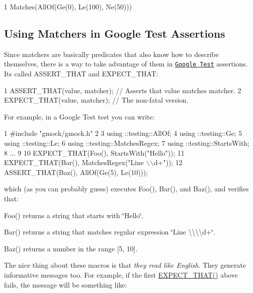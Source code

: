 \begin{DoxyCode}
1 Matches(AllOf(Ge(0), Le(100), Ne(50)))
\end{DoxyCode}


\subsection*{Using Matchers in Google Test Assertions}

Since matchers are basically predicates that also know how to describe themselves, there is a way to take advantage of them in \href{../../googletest/}{\tt Google Test} assertions. It\textquotesingle{}s called {\ttfamily A\+S\+S\+E\+R\+T\+\_\+\+T\+H\+AT} and {\ttfamily E\+X\+P\+E\+C\+T\+\_\+\+T\+H\+AT}\+:


\begin{DoxyCode}
1 ASSERT\_THAT(value, matcher);  // Asserts that value matches matcher.
2 EXPECT\_THAT(value, matcher);  // The non-fatal version.
\end{DoxyCode}


For example, in a Google Test test you can write\+:


\begin{DoxyCode}
1 #include "gmock/gmock.h"
2 
3 using ::testing::AllOf;
4 using ::testing::Ge;
5 using ::testing::Le;
6 using ::testing::MatchesRegex;
7 using ::testing::StartsWith;
8 ...
9 
10   EXPECT\_THAT(Foo(), StartsWith("Hello"));
11   EXPECT\_THAT(Bar(), MatchesRegex("Line \(\backslash\)\(\backslash\)d+"));
12   ASSERT\_THAT(Baz(), AllOf(Ge(5), Le(10)));
\end{DoxyCode}


which (as you can probably guess) executes {\ttfamily Foo()}, {\ttfamily Bar()}, and {\ttfamily Baz()}, and verifies that\+:


\begin{DoxyItemize}
\item {\ttfamily Foo()} returns a string that starts with {\ttfamily \char`\"{}\+Hello\char`\"{}}.
\item {\ttfamily Bar()} returns a string that matches regular expression {\ttfamily \char`\"{}\+Line \textbackslash{}\textbackslash{}\textbackslash{}\textbackslash{}d+\char`\"{}}.
\item {\ttfamily Baz()} returns a number in the range \mbox{[}5, 10\mbox{]}.
\end{DoxyItemize}

The nice thing about these macros is that {\itshape they read like English}. They generate informative messages too. For example, if the first {\ttfamily \hyperlink{gmock-matchers_8h_ac31e206123aa702e1152bb2735b31409}{E\+X\+P\+E\+C\+T\+\_\+\+T\+H\+A\+T()}} above fails, the message will be something like\+:


